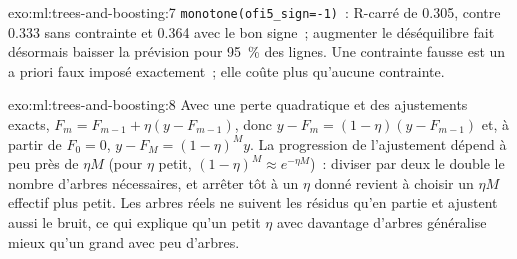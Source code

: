 \begin{solution}{exo:ml:trees-and-boosting:7}
\texttt{monotone(ofi5\_sign=-1)}~: R-carré de 0.305, contre 0.333 sans contrainte et 0.364 avec le bon signe~; augmenter
le déséquilibre fait désormais baisser la prévision pour 95~\% des lignes. Une contrainte fausse est un a priori faux imposé exactement~; elle coûte
plus qu'aucune contrainte.
\end{solution}

\begin{solution}{exo:ml:trees-and-boosting:8}
Avec une perte quadratique et des ajustements exacts, $F_m = F_{m-1} + \eta(y - F_{m-1})$, donc $y - F_m = (1 - \eta)(y - F_{m-1})$ et, à partir
de $F_0 = 0$, $y - F_M = (1 - \eta)^My$. La progression de l'ajustement dépend à peu près de $\eta M$ (pour $\eta$ petit, $(1 - \eta)^M
\approx e^{-\eta M}$)~: diviser par deux le  double le nombre d'arbres nécessaires, et arrêter tôt à un $\eta$ donné revient à
choisir un $\eta M$ effectif plus petit. Les arbres réels ne suivent les résidus qu'en partie et ajustent aussi le bruit, ce qui explique qu'un petit
$\eta$ avec davantage d'arbres généralise mieux qu'un grand avec peu d'arbres.
\end{solution}

